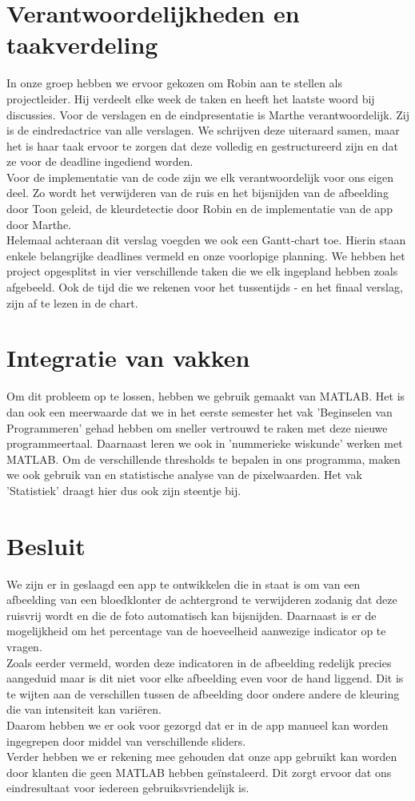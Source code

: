 \documentclass[a4paper,kulak]{kulakarticle}
\begin{document}
\section{Verantwoordelijkheden en taakverdeling}		
In onze groep hebben we ervoor gekozen om Robin aan te stellen als projectleider. Hij verdeelt elke week de taken en heeft het laatste woord bij discussies. 
Voor de verslagen en de eindpresentatie is Marthe verantwoordelijk. Zij is de eindredactrice van alle verslagen. We schrijven deze uiteraard samen, maar het is haar taak ervoor te zorgen dat deze volledig en gestructureerd zijn en dat ze voor de deadline ingediend worden.\\
Voor de implementatie van de code zijn we elk verantwoordelijk voor ons eigen deel. Zo wordt het verwijderen van de ruis en het bijsnijden van de afbeelding door Toon geleid, de kleurdetectie door Robin en de implementatie van de app door Marthe.\\
Helemaal achteraan dit verslag voegden we ook een Gantt-chart toe. Hierin staan enkele belangrijke deadlines vermeld en onze voorlopige planning. We hebben het project opgesplitst in vier verschillende taken die we elk ingepland hebben zoals afgebeeld. Ook de tijd die we rekenen voor het tussentijds - en het finaal verslag, zijn af te lezen in de chart.

\section{Integratie van vakken}
Om dit probleem op te lossen, hebben we gebruik gemaakt van MATLAB. Het is dan ook een meerwaarde dat we in het eerste semester het vak 'Beginselen van Programmeren' gehad hebben om sneller vertrouwd te raken met deze nieuwe programmeertaal. Daarnaast leren we ook in 'nummerieke wiskunde' werken met MATLAB. Om de verschillende thresholds te bepalen in ons programma, maken we ook gebruik van en statistische analyse van de pixelwaarden. Het vak 'Statistiek' draagt hier dus ook zijn steentje bij.

\section{Besluit}	
We zijn er in geslaagd een app te ontwikkelen die in staat is om van een afbeelding van een bloedklonter de achtergrond te verwijderen zodanig dat deze ruisvrij wordt en die de foto automatisch kan bijsnijden. Daarnaast is er de mogelijkheid om het percentage van de hoeveelheid aanwezige indicator op te vragen.\\ 
Zoals eerder vermeld, worden deze indicatoren in de afbeelding redelijk precies aangeduid maar is dit niet voor elke afbeelding even voor de hand liggend. Dit is te wijten aan de verschillen tussen de afbeelding door ondere andere de kleuring die van intensiteit kan variëren. \\
Daarom hebben we er ook voor gezorgd dat er in de app manueel kan worden ingegrepen door middel van verschillende sliders. \\ 
Verder hebben we er rekening mee gehouden dat onze app gebruikt kan worden door klanten die geen MATLAB hebben geïnstaleerd. Dit zorgt ervoor dat ons eindresultaat voor iedereen gebruiksvriendelijk is.


\newpage




\end{document}
